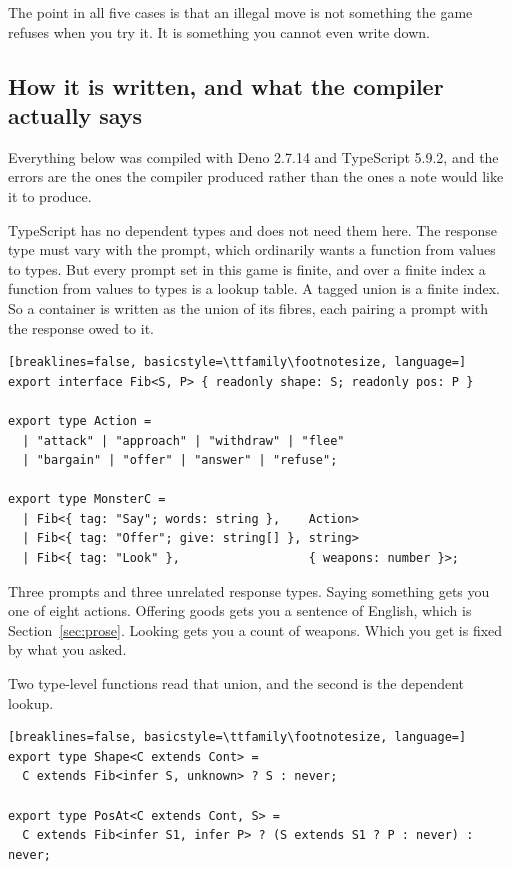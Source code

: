 \documentclass[11pt,a4paper]{article}
\begin{document}
The point in all five cases is that an illegal move is not something the game refuses when you
try it. It is something you cannot even write down.

\subsection{How it is written, and what the compiler actually says}

Everything below was compiled with Deno 2.7.14 and TypeScript 5.9.2, and the errors are the ones
the compiler produced rather than the ones a note would like it to produce.

TypeScript has no dependent types and does not need them here. The response type must vary with
the prompt, which ordinarily wants a function from values to types. But every prompt set in this
game is finite, and over a finite index a function from values to types is a lookup table. A tagged
union is a finite index. So a container is written as the union of its fibres, each pairing a
prompt with the response owed to it.

\begin{lstlisting}[breaklines=false, basicstyle=\ttfamily\footnotesize, language=]
export interface Fib<S, P> { readonly shape: S; readonly pos: P }

export type Action =
  | "attack" | "approach" | "withdraw" | "flee"
  | "bargain" | "offer" | "answer" | "refuse";

export type MonsterC =
  | Fib<{ tag: "Say"; words: string },    Action>
  | Fib<{ tag: "Offer"; give: string[] }, string>
  | Fib<{ tag: "Look" },                  { weapons: number }>;
\end{lstlisting}

Three prompts and three unrelated response types. Saying something gets you one of eight actions.
Offering goods gets you a sentence of English, which is Section~\ref{sec:prose}. Looking gets you a
count of weapons. Which you get is fixed by what you asked.

Two type-level functions read that union, and the second is the dependent lookup.

\begin{lstlisting}[breaklines=false, basicstyle=\ttfamily\footnotesize, language=]
export type Shape<C extends Cont> =
  C extends Fib<infer S, unknown> ? S : never;

export type PosAt<C extends Cont, S> =
  C extends Fib<infer S1, infer P> ? (S extends S1 ? P : never) : never;
\end{lstlisting}
\end{document}
